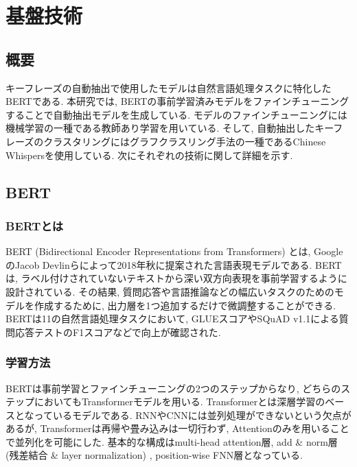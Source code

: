 \chapter{基盤技術}
\label{chap:kibangijyutu}



\section{概要}
キーフレーズの自動抽出で使用したモデルは自然言語処理タスクに特化したBERTである. 本研究では, BERTの事前学習済みモデルをファインチューニングすることで自動抽出モデルを生成している. 
モデルのファインチューニングには機械学習の一種である教師あり学習を用いている. 
そして, 自動抽出したキーフレーズのクラスタリングにはグラフクラスリング手法の一種であるChinese Whispersを使用している. 
次にそれぞれの技術に関して詳細を示す. 


\section{BERT}
\subsection{BERTとは}\label{aboutbert}
BERT (Bidirectional Encoder Representations from Transformers) \cite{bert}とは, GoogleのJacob Devlinらによって2018年秋に提案された言語表現モデルである. BERTは, ラベル付けされていないテキストから深い双方向表現を事前学習するように設計されている. その結果, 質問応答や言語推論などの幅広いタスクのためのモデルを作成するために, 出力層を1つ追加するだけで微調整することができる. 
BERTは11の自然言語処理タスクにおいて, GLUEスコアやSQuAD v1.1による質問応答テストのF1スコアなどで向上が確認された. \cite{bert}

\subsection{学習方法}
BERTは事前学習とファインチューニングの2つのステップからなり, どちらのステップにおいてもTransformerモデルを用いる. Transformerとは深層学習のベースとなっているモデルである. RNNやCNNには並列処理ができないという欠点があるが, Transformerは再帰や畳み込みは一切行わず, Attentionのみを用いることで並列化を可能にした. 基本的な構成はmulti-head attention層, add \& norm層 (残差結合 \& layer normalization) , position-wise FNN層となっている. 

